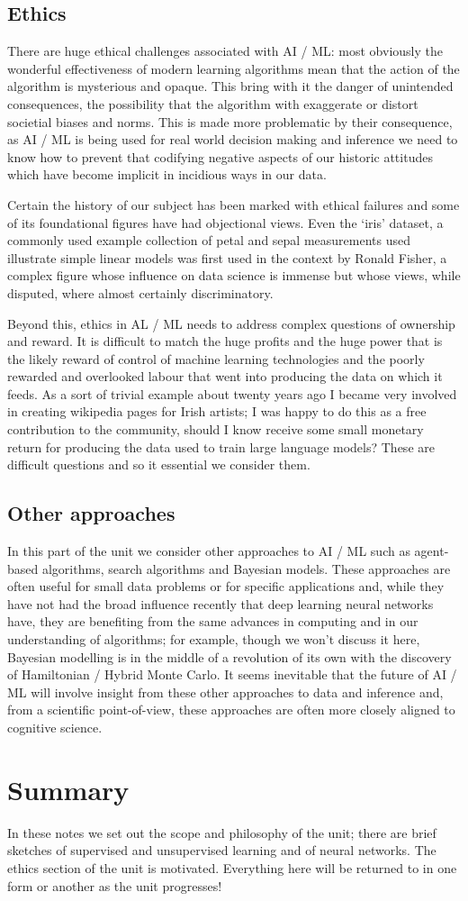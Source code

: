 \documentclass[12pt]{article}
\begin{document}
\subsection{Ethics}

There are huge ethical challenges associated with AI / ML: most
obviously the wonderful effectiveness of modern learning algorithms
mean that the action of the algorithm is mysterious and opaque. This
bring with it the danger of unintended consequences, the possibility
that the algorithm with exaggerate or distort societial biases and
norms. This is made more problematic by their consequence, as AI / ML
is being used for real world decision making and inference we need to
know how to prevent that codifying negative aspects of our historic
attitudes which have become implicit in incidious ways in our data.

Certain the history of our subject has been marked with
ethical failures and some of its foundational figures have had
objectional views. Even the `iris' dataset, a commonly used example
collection of petal and sepal measurements used illustrate simple
linear models was first used in the context by Ronald Fisher, a
complex figure whose influence on data science is immense but whose
views, while disputed, where almost certainly discriminatory.

Beyond this, ethics in AL / ML needs to address complex questions of
ownership and reward. It is difficult to match the huge profits and
the huge power that is the likely reward of control of machine
learning technologies and the poorly rewarded and overlooked labour
that went into producing the data on which it feeds. As a sort of
trivial example about twenty years ago I became very involved in
creating wikipedia pages for Irish artists; I was happy to do this as
a free contribution to the community, should I know receive some small
monetary return for producing the data used to train large language
models? These are difficult questions and so it essential we consider
them.

\subsection{Other approaches}

In this part of the unit we consider other approaches to AI / ML such
as agent-based algorithms, search algorithms and Bayesian
models. These approaches are often useful for small data problems or
for specific applications and, while they have not had the broad
influence recently that deep learning neural networks have, they are
benefiting from the same advances in computing and in our
understanding of algorithms; for example, though we won't discuss it
here, Bayesian modelling is in the middle of a revolution of its own
with the discovery of Hamiltonian / Hybrid Monte Carlo. It seems
inevitable that the future of AI / ML will involve insight from these
other approaches to data and inference and, from a scientific
point-of-view, these approaches are often more closely aligned to
cognitive science.

\section{Summary}

In these notes we set out the scope and philosophy of the unit; there
are brief sketches of supervised and unsupervised learning and of
neural networks. The ethics section of the unit is
motivated. Everything here will be returned to in one form or another
as the unit progresses!
\end{document}
